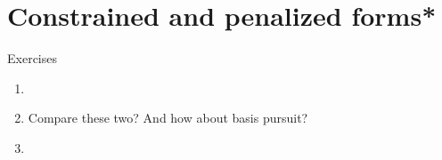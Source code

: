 \section{Constrained and penalized forms*}

\begin{xcb}{Exercises}
\begin{enumerate}[label=\thechapter.\arabic*]
\settowidth{\leftmargini}{00.00.\hskip\labelsep}
\item 

\item \label{ex:lasso_dantzig}
Compare these two? And how about basis pursuit?

\item \label{ex:simplex_projection}

\end{enumerate}
\end{xcb}